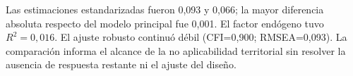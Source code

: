 Las estimaciones estandarizadas fueron 0,093 y 0,066; la mayor diferencia absoluta respecto del modelo principal fue 0,001. El factor endógeno tuvo $R^2=0,016$. El ajuste robusto continuó débil (CFI=0,900; RMSEA=0,093). La comparación informa el alcance de la no aplicabilidad territorial sin resolver la ausencia de respuesta restante ni el ajuste del diseño.
